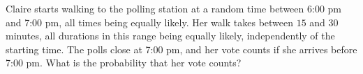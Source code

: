 Claire starts walking to the polling station at a random time between 6:00 pm and 7:00 pm, all times being equally likely. Her walk takes between $15$ and $30$ minutes, all durations in this range being equally likely, independently of the starting time. The polls close at 7:00 pm, and her vote counts if she arrives before 7:00 pm. What is the probability that her vote counts?
